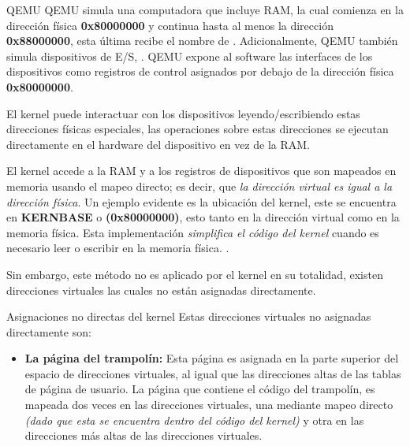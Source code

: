 \documentclass{libs/ufc_format}
\begin{document}
\begin{frame}{QEMU}
    QEMU simula una computadora que incluye RAM, la cual comienza en la dirección física \textbf{0x80000000} y continua hasta al menos la dirección \textbf{0x88000000}, esta última recibe el nombre de . Adicionalmente, QEMU también simula dispositivos de E/S, . QEMU expone al software las interfaces de los dispositivos como registros de control asignados por debajo de la dirección física \textbf{0x80000000}.

    \vspace{0.3cm}

    El kernel puede interactuar con los dispositivos leyendo/escribiendo estas direcciones físicas especiales, las operaciones sobre estas direcciones se ejecutan directamente en el hardware del dispositivo en vez de la RAM. \cite{xv6_book}
\end{frame}
\begin{frame}{}
    El kernel accede a la RAM y a los registros de dispositivos que son mapeados en memoria usando el mapeo directo; es decir, que \emph{la dirección virtual es igual a la dirección física}. Un ejemplo evidente es la ubicación del kernel, este se encuentra en \textbf{KERNBASE} o \textbf{(0x80000000)}, esto tanto en la dirección virtual como en la memoria física. Esta implementación \emph{simplifica el código del kernel} cuando es necesario leer o escribir en la memoria física. \cite{xv6_book}.
    
    \vspace{0.3cm}
    
    Sin embargo, este método no es aplicado por el kernel en su totalidad, existen direcciones virtuales las cuales no están asignadas directamente.
\end{frame}
\begin{frame}{Asignaciones no directas del kernel}
    Estas direcciones virtuales no asignadas directamente son:
    \begin{itemize}
        \item \textbf{La página del trampolín:} Esta página es asignada en la parte superior del espacio de direcciones virtuales, al igual que las direcciones altas de las tablas de página de usuario. La página que contiene el código del trampolín, es mapeada dos veces en las direcciones virtuales, una mediante mapeo directo \emph{(dado que esta se encuentra dentro del código del kernel)} y otra en las direcciones más altas de las direcciones virtuales. \cite{xv6_book}
    \end{itemize}
\end{frame}
\end{document}
